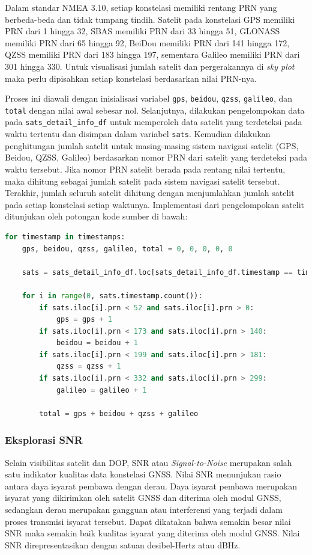 Dalam standar NMEA 3.10, setiap konstelasi memiliki rentang PRN yang berbeda-beda dan tidak tumpang tindih. Satelit pada konstelasi GPS memiliki PRN dari 1 hingga 32, SBAS memiliki PRN dari 33 hingga 51, GLONASS memiliki PRN dari 65 hingga 92, BeiDou memiliki PRN dari 141 hingga 172, QZSS memiliki PRN dari 183 hingga 197, sementara Galileo memiliki PRN dari 301 hingga 330. Untuk visualisasi jumlah satelit dan pergerakannya di \textit{sky plot} maka perlu dipisahkan setiap konstelasi berdasarkan nilai PRN-nya.

Proses ini diawali dengan inisialisasi variabel \texttt{gps}, \texttt{beidou}, \texttt{qzss}, \texttt{galileo}, dan \texttt{total} dengan nilai awal sebesar nol. Selanjutnya, dilakukan pengelompokan data pada \texttt{sats\_detail\_info\_df} untuk memperoleh data satelit yang terdeteksi pada waktu tertentu dan disimpan dalam variabel \texttt{sats}. Kemudian dilakukan penghitungan jumlah satelit untuk masing-masing sistem navigasi satelit (GPS, Beidou, QZSS, Galileo) berdasarkan nomor PRN dari satelit yang terdeteksi pada waktu tersebut. Jika nomor PRN satelit berada pada rentang nilai tertentu, maka dihitung sebagai jumlah satelit pada sistem navigasi satelit tersebut. Terakhir, jumlah seluruh satelit dihitung dengan menjumlahkan jumlah satelit pada setiap konstelasi setiap waktunya. Implementasi dari pengelompokan satelit ditunjukan oleh potongan kode sumber di bawah:

\begin{lstlisting}[language=python]
for timestamp in timestamps:
	gps, beidou, qzss, galileo, total = 0, 0, 0, 0, 0
	
	sats = sats_detail_info_df.loc[sats_detail_info_df.timestamp == timestamp]
	
	for i in range(0, sats.timestamp.count()):
		if sats.iloc[i].prn < 52 and sats.iloc[i].prn > 0:
			gps = gps + 1
		if sats.iloc[i].prn < 173 and sats.iloc[i].prn > 140:
			beidou = beidou + 1
		if sats.iloc[i].prn < 199 and sats.iloc[i].prn > 181:
			qzss = qzss + 1
		if sats.iloc[i].prn < 332 and sats.iloc[i].prn > 299:
			galileo = galileo + 1 
		
		total = gps + beidou + qzss + galileo
\end{lstlisting}

\iffalse
\subsubsection{Eksplorasi SNR}
Selain visibilitas satelit dan DOP, SNR atau \textit{Signal-to-Noise} merupakan salah satu indikator kualitas data konstelasi GNSS. Nilai SNR menunjukan rasio antara daya isyarat pembawa dengan derau. Daya isyarat pembawa merupakan isyarat yang dikirimkan oleh satelit GNSS dan diterima oleh modul GNSS, sedangkan derau merupakan gangguan atau interferensi yang terjadi dalam proses transmisi isyarat tersebut. Dapat dikatakan bahwa semakin besar nilai SNR maka semakin baik kualitas isyarat yang diterima oleh modul GNSS. Nilai SNR direpresentasikan dengan satuan desibel-Hertz atau dBHz.

